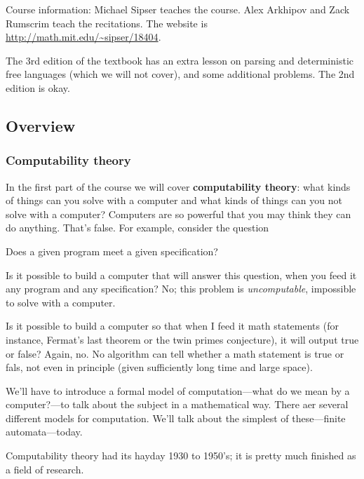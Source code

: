 Course information: Michael Sipser teaches the course. Alex Arkhipov and Zack Rumscrim teach the recitations. The website is 
\url{http://math.mit.edu/\~sipser/18404}.

The 3rd edition of the textbook has an extra lesson on parsing and  deterministic free languages (which we will not cover), and some additional problems. The 2nd edition is okay.


\subsection{Overview}

\subsubsection{Computability theory}

In the first part of the course we will cover \textbf{computability theory}: what kinds of things can you solve with a computer and what kinds of things can you not solve with a computer? Computers are so powerful that you may think they can do anything. That's false. For example, consider the question

\begin{center}Does a given program meet a given specification?\end{center}

\noindent
Is it possible to build a computer that will answer this question, when you feed it any program and any specification? No; this problem is {\it uncomputable}, impossible to solve with a computer. 

Is it possible to build a computer so that when I feed it math statements (for instance, Fermat's last theorem or the twin primes conjecture), it will output true or false? Again, no. No algorithm can tell whether a math statement is true or fals, not even in principle (given sufficiently long time and large space).

We'll have to introduce a formal model of computation---what do we mean by a computer?---to talk about the subject in a mathematical way. There aer several different models for computation. We'll talk about the simplest of these---finite automata---today.

Computability theory had its hayday 1930 to 1950's; it is pretty much finished as a field of research. 

